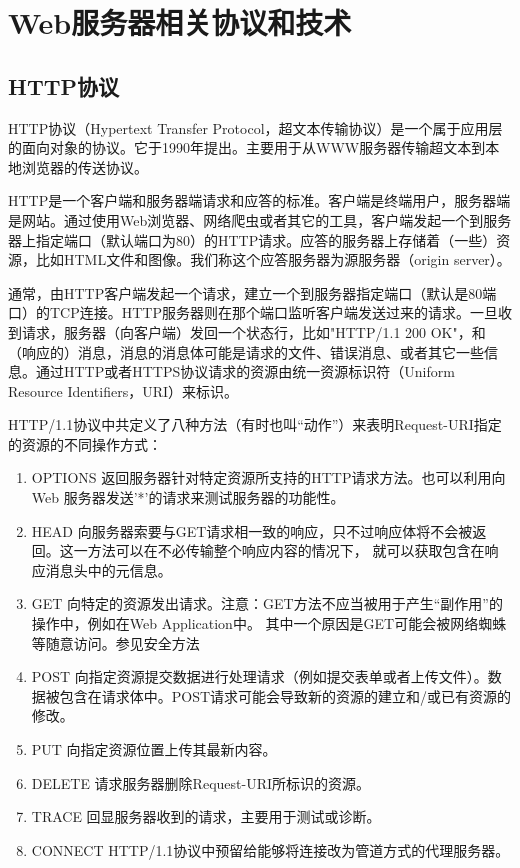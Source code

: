 \documentclass[12pt, twoside, a4paper, xetex]{report}
\begin{document}
\chapter{Web服务器相关协议和技术}

\section{HTTP协议}
	HTTP协议（Hypertext Transfer Protocol，超文本传输协议）是一个属于应用层的面向对象的协议。它于1990年提出。主要用于从WWW服务器传输超文本到本地浏览器的传送协议。
	
	HTTP是一个客户端和服务器端请求和应答的标准。客户端是终端用户，服务器端是网站。通过使用Web浏览器、网络爬虫或者其它的工具，客户端发起一个到服务器上指定端口（默认端口为80）的HTTP请求。应答的服务器上存储着（一些）资源，比如HTML文件和图像。我们称这个应答服务器为源服务器（origin server）。
	
	通常，由HTTP客户端发起一个请求，建立一个到服务器指定端口（默认是80端口）的TCP连接。HTTP服务器则在那个端口监听客户端发送过来的请求。一旦收到请求，服务器（向客户端）发回一个状态行，比如"HTTP/1.1 200 OK"，和（响应的）消息，消息的消息体可能是请求的文件、错误消息、或者其它一些信息。通过HTTP或者HTTPS协议请求的资源由统一资源标识符（Uniform Resource Identifiers，URI）来标识。
	
	HTTP/1.1协议中共定义了八种方法（有时也叫“动作”）来表明Request-URI指定的资源的不同操作方式：
	\begin{enumerate}
		\item OPTIONS 返回服务器针对特定资源所支持的HTTP请求方法。也可以利用向Web 服务器发送'*'的请求来测试服务器的功能性。
		\item HEAD 向服务器索要与GET请求相一致的响应，只不过响应体将不会被返回。这一方法可以在不必传输整个响应内容的情况下，
					就可以获取包含在响应消息头中的元信息。
		\item GET 向特定的资源发出请求。注意：GET方法不应当被用于产生“副作用”的操作中，例如在Web Application中。
					其中一个原因是GET可能会被网络蜘蛛等随意访问。参见安全方法
		\item POST 向指定资源提交数据进行处理请求（例如提交表单或者上传文件）。数据被包含在请求体中。POST请求可能会导致新的资源的建立和/或已有资源的修改。
		\item PUT 向指定资源位置上传其最新内容。
		\item DELETE 请求服务器删除Request-URI所标识的资源。
		\item TRACE 回显服务器收到的请求，主要用于测试或诊断。
		\item CONNECT HTTP/1.1协议中预留给能够将连接改为管道方式的代理服务器。
	\end{enumerate}
	
\end{document}
